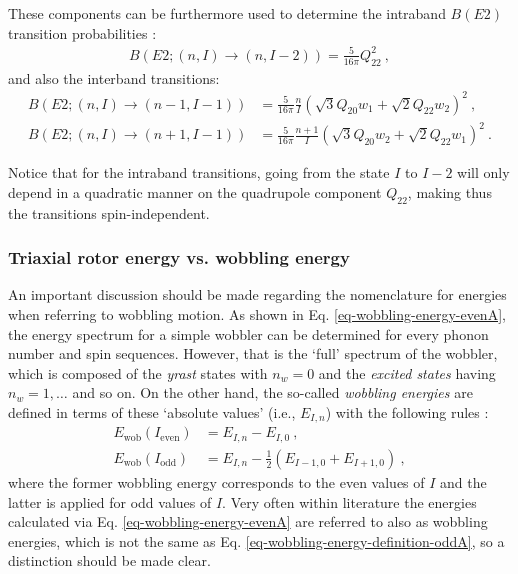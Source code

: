 These components can be furthermore used to determine the intraband $B(E2)$ transition probabilities \cite{wen2015wobbling}:
\begin{align}
    B(E2;(n,I)\to(n,I-2))=\frac{5}{16\pi}Q_{22}^2\ ,
    \label{intraband-probability-simple-wobbler}
\end{align}
and also the interband transitions:
\begin{align}
    B(E2;(n,I)\to(n-1,I-1))&=\frac{5}{16\pi}\frac{n}{I}\left(\sqrt{3}Q_{20}w_1+\sqrt{2}Q_{22}w_2\right)^2\ , \label{interband-probability-simple-wobbler-1}\\
    B(E2;(n,I)\to(n+1,I-1))&=\frac{5}{16\pi}\frac{n+1}{I}\left(\sqrt{3}Q_{20}w_2+\sqrt{2}Q_{22}w_1\right)^2\ .
    \label{interband-probability-simple-wobbler-2}
\end{align}

Notice that for the intraband transitions, going from the state $I$ to $I-2$ will only depend in a quadratic manner on the quadrupole component $Q_{22}$, making thus the transitions spin-independent.

\subsubsection*{Triaxial rotor energy vs. wobbling energy}

An important discussion should be made regarding the nomenclature for energies when referring to wobbling motion. As shown in Eq. \ref{eq-wobbling-energy-evenA}, the energy spectrum for a simple wobbler can be determined for every phonon number and spin sequences. However, that is the `full' spectrum  of the wobbler, which is composed of the \emph{yrast} states with $n_w=0$ and the \emph{excited states} having $n_w=1,\dots$ and so on. On the other hand, the so-called \emph{wobbling energies} are defined in terms of these `absolute values' (i.e., $E_{I,n}$) with the following rules \cite{wen2015wobbling}:
\begin{align}
    E_\text{wob}(I_\text{even})&=E_{I,n}-E_{I,0}\ , \label{eq-wobbling-energy-definition-evenA} \\
    E_\text{wob}(I_\text{odd})&=E_{I,n}-\frac{1}{2}\left(E_{I-1,0}+E_{I+1,0}\right)\ ,
    \label{eq-wobbling-energy-definition-oddA}
\end{align}
where the former wobbling energy corresponds to the even values of $I$ and the latter is applied for odd values of $I$. Very often within literature the energies calculated via Eq. \ref{eq-wobbling-energy-evenA} are referred to also as wobbling energies, which is not the same as Eq. \ref{eq-wobbling-energy-definition-oddA}, so a distinction should be made clear.

